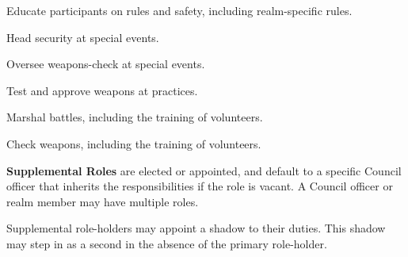 \documentclass[12pt]{article}
\begin{document}
\begin{level}
\begin{level}
\begin{level}
            \item Educate participants on rules and safety, including realm-specific rules. 
            \item Head security at special events.
            \item Oversee weapons-check at special events.
            \item Test and approve weapons at practices.
            \item {}
            \begin{level}
                \item Marshal battles, including the training of volunteers.
                \item Check weapons, including the training of volunteers.
            \end{level}
        \end{level}
\end{level}
\item \textbf{Supplemental Roles} are elected or appointed, and default to a specific Council officer that inherits the responsibilities if the role is vacant. A Council officer or realm member may have multiple roles.\label{supplemental_roles}
\begin{level}
    \item Supplemental role-holders may appoint a shadow to their duties. This shadow may step in as a second in the absence of the primary role-holder.


\end{level}
\end{level}
\end{document}
